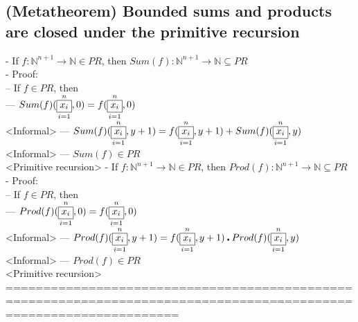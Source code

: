 \documentclass{book}
\newcommand{\vdc}[3]{\underset{#2}{\overset{#3}{\fbox{$#1$}}}}
\begin{document}
\subsection{(Metatheorem) Bounded sums and products are closed under the primitive recursion} %
	- If $f: \mathbb{N}^{n+1} \rightarrow \mathbb{N} \in PR$, then $Sum(f): \mathbb{N}^{n+1} \rightarrow \mathbb{N} \subseteq PR$ \\
	- Proof: \\
		-- If $f \in PR$, then \\
			--- $Sum(f)(\vdc{x_i}{i=1}{n}, 0) = f(\vdc{x_i}{i=1}{n}, 0)$ \\ <Informal>
			--- $Sum(f)(\vdc{x_i}{i=1}{n}, y+1) = f(\vdc{x_i}{i=1}{n}, y+1) + Sum(f)(\vdc{x_i}{i=1}{n}, y)$ \\ <Informal>
			--- $Sum(f) \in PR$ \\ <Primitive recursion>
	- If $f: \mathbb{N}^{n+1} \rightarrow \mathbb{N} \in PR$, then $Prod(f): \mathbb{N}^{n+1} \rightarrow \mathbb{N} \subseteq PR$ \\
	- Proof: \\
		-- If $f \in PR$, then \\
			--- $Prod(f)(\vdc{x_i}{i=1}{n}, 0) = f(\vdc{x_i}{i=1}{n}, 0)$ \\ <Informal>
			--- $Prod(f)(\vdc{x_i}{i=1}{n}, y+1) = f(\vdc{x_i}{i=1}{n}, y+1) \centerdot Prod(f)(\vdc{x_i}{i=1}{n}, y)$ \\ <Informal>
			--- $Prod(f) \in PR$ \\ <Primitive recursion>
	===================================================================================================================
\end{document}
